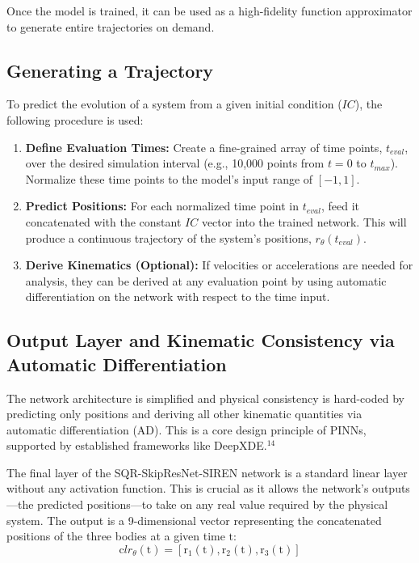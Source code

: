 \documentclass{article}
\begin{document}
Once the model is trained, it can be used as a high-fidelity function approximator to generate entire trajectories on demand.

\subsection{Generating a Trajectory}
To predict the evolution of a system from a given initial condition ($IC$), the following procedure is used:
\begin{enumerate}
    \item \textbf{Define Evaluation Times:} Create a fine-grained array of time points, $t_{eval}$, over the desired simulation interval (e.g., 10,000 points from $t=0$ to $t_{max}$). Normalize these time points to the model's input range of $[-1, 1]$.
    \item \textbf{Predict Positions:} For each normalized time point in $t_{eval}$, feed it concatenated with the constant $IC$ vector into the trained network. This will produce a continuous trajectory of the system's positions, $r_{\theta}(t_{eval})$.
    \item \textbf{Derive Kinematics (Optional):} If velocities or accelerations are needed for analysis, they can be derived at any evaluation point by using automatic differentiation on the network with respect to the time input.
\end{enumerate}





\subsection{Output Layer and Kinematic Consistency via Automatic Differentiation}


The network architecture is simplified and physical consistency is hard-coded by predicting only positions and deriving all other kinematic quantities via automatic differentiation (AD). This is a core design principle of PINNs, supported by established frameworks like DeepXDE.$^{14}$

The final layer of the SQR-SkipResNet-SIREN network is a standard linear layer without any activation function. This is crucial as it allows the network's outputs—the predicted positions—to take on any real value required by the physical system. The output is a 9-dimensional vector representing the concatenated positions of the three bodies at a given time $\mathrm{t}$:
\[
\mathrm cl r_\theta(\mathrm{t}) = [\mathrm{r}_1(\mathrm{t}), \mathrm{r}_2(\mathrm{t}), \mathrm{r}_3(\mathrm{t})]
\]
\end{document}
